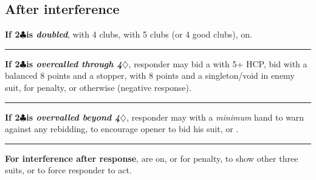\documentclass[oneside]{memoir}
\def\C{$\clubsuit$}
\def\D{$\diamondsuit$}
\begin{document}
\subsection{After interference}
\iffalse %
\begin{ptable}\headings{0-4|5-7|8+}
\multicolumn4c{After double (other responses on)}\\
\row{4 clubs}\bid(0-8,lblue){pass}\\
\row{5 clubs (4 good clubs)}\bid(0-8,lyellow){redouble}\\
\multicolumn4c{After overcall beyond 4\D}\\
\row{good 6-card or longer suit}\bid(0-7,lorange){double}
  \bid(8,lyellow){bid suit}\\
\row{want to hear opener's suit}\bid*(0-4,lorange){double}
  \bid(5-8,lred){pass}\\
\end{ptable}\hfill
\begin{ptable}\headings{0-4|5-7|8+}
\multicolumn4c{After overcall through 4\D}\\
\row{5-card suit}\bid*(0-4,lorange){pass}\bid(5-8,lgreen){bid suit}\\
\row{long enemy suit}\bid*(0-4,lorange){pass}\bid(5-8,laqua){penalty double}\\
\row{balanced + 1 stopper}\bid*(0-7,lorange){pass}\bid(8,lred){NT}\\
\row{\singleton/void in enemy suit}\bid(0-7,lorange){\cdrop[-.45pc]{pass}}
  \bid(8,lpurple){cue-bid}\\
\end{ptable}
\fi

\noindent \textbf{If 2\C is \emph{doubled}}, 
with 4 clubs,  with 5 clubs (or 4 good
clubs),  on.
\vskip0.25pc\hrule\vskip0.25pc
\noindent \textbf{If 2\C is \emph{overcalled through 4\D}}, responder may bid a
 with 5+ HCP, bid 
with a balanced 8 points and a stopper, 
with 8 points and a singleton/void in enemy suit, 
for penalty, or  otherwise (negative response).
\vskip0.25pc\hrule\vskip0.25pc
\noindent \textbf{If 2\C is \emph{overvalled beyond 4\D}}, responder may
 with a \emph{minimum} hand to warn against any
rebidding,  to encourage opener to bid his suit,
or .
\vskip0.25pc\hrule\vskip0.25pc
\noindent \textbf{For interference after response},
 are on,  or
 for penalty,  to show
other three suits, or  to force responder
to act.
\end{document}
